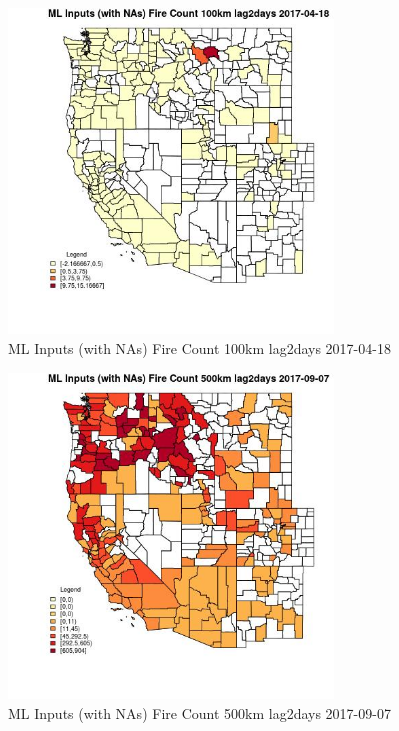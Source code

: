 \begin{figure} 
\centering  
\includegraphics[width=0.77\textwidth]{Code_Outputs/Report_ML_input_PM25_Step4_part_e_de_duplicated_aves_compiled_2019-05-21wNAs_CountyFire_Count_100km_lag2daysMean2017-04-18.jpg} 
\caption{\label{fig:Report_ML_input_PM25_Step4_part_e_de_duplicated_aves_compiled_2019-05-21wNAsCountyFire_Count_100km_lag2daysMean2017-04-18}ML Inputs (with NAs) Fire Count 100km lag2days 2017-04-18} 
\end{figure} 
 

\begin{figure} 
\centering  
\includegraphics[width=0.77\textwidth]{Code_Outputs/Report_ML_input_PM25_Step4_part_e_de_duplicated_aves_compiled_2019-05-21wNAs_CountyFire_Count_500km_lag2daysMean2017-09-07.jpg} 
\caption{\label{fig:Report_ML_input_PM25_Step4_part_e_de_duplicated_aves_compiled_2019-05-21wNAsCountyFire_Count_500km_lag2daysMean2017-09-07}ML Inputs (with NAs) Fire Count 500km lag2days 2017-09-07} 
\end{figure} 
 

